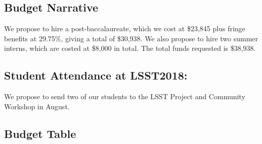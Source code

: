 
\subsection{Budget Narrative}


%

We propose to hire a post-baccalaureate, which we cost at \$23,845 
plus fringe benefits at 29.75\%, giving a total of \$30,938.   
We also propose to hire two summer interns, which are costed at \$8,000 in total.  
The total funds requested is \$38,938.




\subsection{Student Attendance at LSST2018:}

We propose to send two of our students  to the LSST Project and Community Workshop
in August.

\newpage
\subsection{Budget Table}


